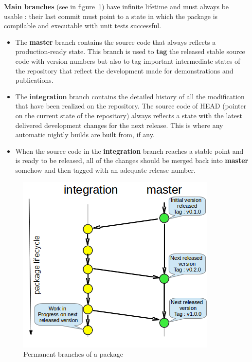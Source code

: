 \documentclass[12pt,a4paper]{article}
\begin{document}
\textbf{Main branches} (see in figure~\ref{fig-perm-branches}) have infinite lifetime and must always be usable : their last commit must point to a state in which the package is compilable and executable with unit tests successful.
\begin{itemize}
\item The \textbf{master} branch contains the source code that always reflects a production-ready state. This branch is used to \textbf{tag} the released stable source code with version numbers but also to tag important intermediate states of the repository that reflect the development made for demonstrations and publications. 
\item The \textbf{integration} branch contains the detailed history of all the modification that have been realized on the repository. The source code of HEAD (pointer on the current state of the repository) always reflects a state with the latest delivered development changes for the next release. This is where any automatic nightly builds are built from, if any.
\item When the source code in the \textbf{integration} branch reaches a stable point and is ready to be released, all of the changes should be merged back into \textbf{master} somehow and then tagged with an adequate release number.
\end{itemize}


\begin{figure}
\center
\includegraphics[scale=1]{images/permanent_branches.png}
\caption{Permanent branches of a package}
\label{fig-perm-branches}
\end{figure}
\end{document}
